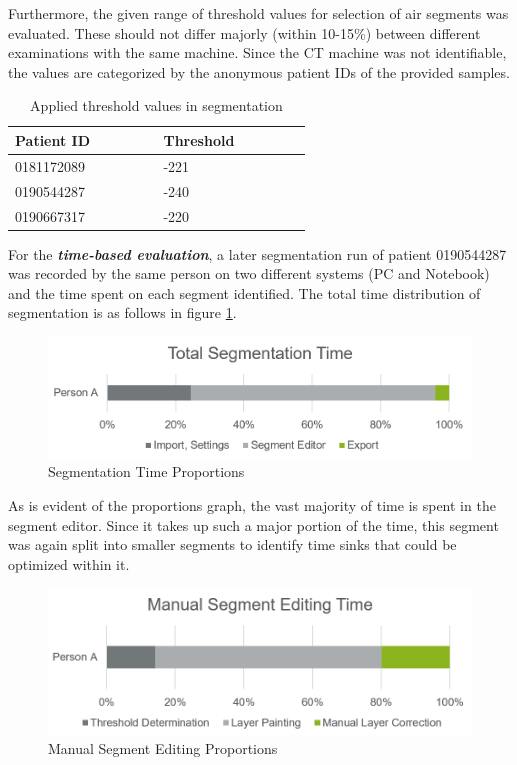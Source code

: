 \documentclass[MME,Projekt,english]{twbook}%
\begin{document}
Furthermore, the given range of threshold values for selection of air segments was evaluated. These should not differ majorly (within 10-15\%) between different examinations with the same machine. Since the CT machine was not identifiable, the values are categorized by the anonymous patient IDs of the provided samples.

\begin{table}[!htbp]
	\centering
	\caption{Applied threshold values in segmentation}\label{tab-threshold}
	\begin{tabular}{| p{0.3\linewidth} | p{0.3\linewidth} |}\hline
		Patient ID & Threshold \\\hline
		0181172089 & -221 \\
		0190544287 & -240 \\
		0190667317 & -220 \\\hline
	\end{tabular}
\end{table}

For the \textbf{\emph{time-based evaluation}}, a later segmentation run of patient 0190544287 was recorded by the same person on two different systems (PC and Notebook) and the time spent on each segment identified. The total time distribution of segmentation is as follows in figure \ref{segmentation-time-proportions}.

\begin{figure}[!htbp]
	\centering
	\includegraphics[width=.8\linewidth]{images/segmentation-time-proportions}
	\caption{Segmentation Time Proportions}\label{segmentation-time-proportions}
\end{figure}

As is evident of the proportions graph, the vast majority of time is spent in the segment editor. Since it takes up such a major portion of the time, this segment was again split into smaller segments to identify time sinks that could be optimized within it.

\begin{figure}[!htbp]
	\centering
	\includegraphics[width=.8\linewidth]{images/manual-segment-editing-proportions}
	\caption{Manual Segment Editing Proportions}\label{manual-segment-editing-proportions}
\end{figure}
\end{document}
